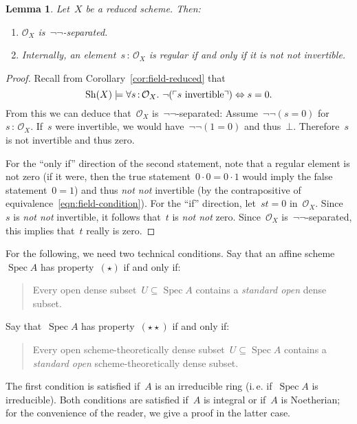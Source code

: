 \documentclass[10pt]{amsart}
\makeatletter
\theoremstyle{definition}
\theoremstyle{plain}
\newtheorem{lemma}[defn]{Lemma}
\theoremstyle{remark}
\renewcommand{\O}{\mathcal{O}}
\newcommand{\Sh}{\mathrm{Sh}}
\DeclareMathOperator{\Spec}{Spec}
\newcommand{\?}{\,{:}\,}
\renewcommand{\_}{\mathpunct{.}\,}
\newcommand{\speak}[1]{\ulcorner\text{\textnormal{#1}}\urcorner}
\newcommand{\ie}{i.\,e.\@\xspace}
\newcommand{\notnot}{\emph{not not}\xspace}
\makeatother
\begin{document}
\begin{lemma}\label{lemma:regular-notnot-invertible}Let~$X$ be a reduced scheme. Then:
\begin{enumerate}
\item $\O_X$ is~$\neg\neg$-separated.
\item Internally, an element~$s\?\O_X$ is regular
if and only if it is \notnot invertible.
\end{enumerate}
\end{lemma}
\begin{proof}Recall from Corollary~\ref{cor:field-reduced} that
\begin{equation}\label{eqn:field-condition}
  \Sh(X) \models \forall s\?\O_X\_ \neg(\speak{$s$ invertible}) \Leftrightarrow
  s=0.
\end{equation}
From this we can deduce that~$\O_X$ is~$\neg\neg$-separated:
Assume~$\neg\neg(s=0)$ for~$s\?\O_X$. If~$s$ were invertible, we would
have~$\neg\neg(1=0)$ and thus~$\bot$. Therefore~$s$ is not invertible and thus
zero.

For the ``only if'' direction of the second statement,
note that a regular element is not zero (if it were, then the true statement~$0
\cdot 0 = 0 \cdot 1$ would imply the false statement~$0 = 1$) and thus \notnot
invertible (by the contrapositive of equivalence~\eqref{eqn:field-condition}). For the ``if''
direction, let~$st = 0$ in~$\O_X$. Since~$s$ is \notnot invertible, it follows
that~$t$ is \notnot zero. Since~$\O_X$ is~$\neg\neg$-separated, this implies
that~$t$ really is zero.
\end{proof}

For the following, we need two technical conditions. Say that an affine
scheme~$\Spec A$ has property~$(\star)$ if and only if:
\begin{quote}
Every open dense subset~$U \subseteq \Spec A$ contains a
\emph{standard open} dense subset.
\end{quote}
Say that~$\Spec A$ has property~$(\star\star)$ if and only if:
\begin{quote}
Every open scheme-theoretically dense subset~$U \subseteq \Spec A$ contains a
\emph{standard open} scheme-theoretically dense subset.
\end{quote}
The first condition is satisfied if~$A$ is an irreducible ring (\ie if~$\Spec A$
is irreducible). Both conditions are satisfied if~$A$ is integral or if~$A$ is
Noetherian; for the convenience of the reader, we give a proof in the
latter case.
\end{document}
